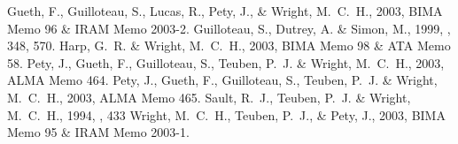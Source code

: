 \documentclass[11pt,twoside]{article}  %
\newcommand{\ALMA}{\textrm{ALMA}}
\begin{document}
%
% 
%
%
\begin{references}
 Gueth, F., Guilloteau, S., Lucas, R., Pety, J., \&
    Wright, M.~C.~H., 2003, BIMA Memo 96 \& IRAM Memo 2003-2.
 Guilloteau, S., Dutrey, A. \& Simon, M., 1999, \aap, 348, 570.
 Harp, G.~R. \& Wright, M.~C.~H., 2003, BIMA Memo 98 \& 
    ATA Memo 58.
 Pety, J., Gueth, F., Guilloteau, S., Teuben, P.~J. \&
    Wright, M.~C.~H., 2003, \ALMA{} Memo 464.
 Pety, J., Gueth, F., Guilloteau, S., Teuben, P.~J. \&
    Wright, M.~C.~H., 2003, \ALMA{} Memo 465.
 Sault, R.~J., Teuben, P.~J. \& Wright, M.~C.~H., 1994, 
    \adassiv, 433
 Wright, M.~C.~H., Teuben, P.~J., \& Pety, J., 2003,
    BIMA Memo 95 \& IRAM Memo 2003-1.
\end{references}

\end{document}
